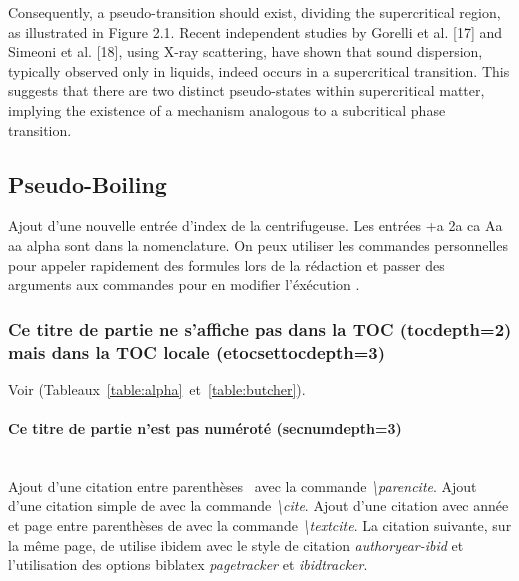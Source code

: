 	Consequently, a pseudo-transition should exist, dividing the supercritical
	region, as illustrated in Figure 2.1. Recent independent studies by Gorelli
	et al. [17] and Simeoni et al. [18], using X-ray scattering, have shown that
	sound dispersion, typically observed only in liquids, indeed occurs in a
	supercritical transition. This suggests that there are two distinct
	pseudo-states within supercritical matter, implying the existence of a
	mechanism analogous to a subcritical phase transition.

	\subsection{Pseudo-Boiling} %

		Ajout d'une nouvelle entrée d'index de la centrifugeuse. Les entrées \gls{+a} \gls{2a} \gls{ca} \gls{Aa} \gls{aa} \gls{alpha} {\NoAutoSpaceBeforeFDP}sont dans la nomenclature. On peux utiliser les commandes personnelles pour appeler rapidement des formules lors de la rédaction \acc et passer des arguments aux commandes pour en modifier l'éxécution \emiss[\nu]{\Omega}.
		
		\subsubsection{Ce titre de partie ne s'affiche pas dans la TOC (tocdepth=2) mais dans la TOC locale (etocsettocdepth=3)}

			Voir (Tableaux~\ref{table:alpha}~et~\ref{table:butcher}).

			\paragraph{Ce titre de partie n'est pas numéroté (secnumdepth=3)}~~\\ %

				Ajout d'une citation entre parenthèses~\parencite{godard_borreliose_2012} avec la commande \textit{\textbackslash parencite}. Ajout d'une citation simple de \cite{zohdy_mapping_2012} avec la commande \textit{\textbackslash cite}. Ajout d'une citation avec année et page entre parenthèses de \textcite[9]{godard_borreliose_2012} avec la commande \textit{\textbackslash textcite}. La citation suivante, sur la même page, de \textcite[12]{godard_borreliose_2012} utilise ibidem avec le style de citation \textit{authoryear-ibid} et l'utilisation des options biblatex \textit{pagetracker} et \textit{ibidtracker}.

